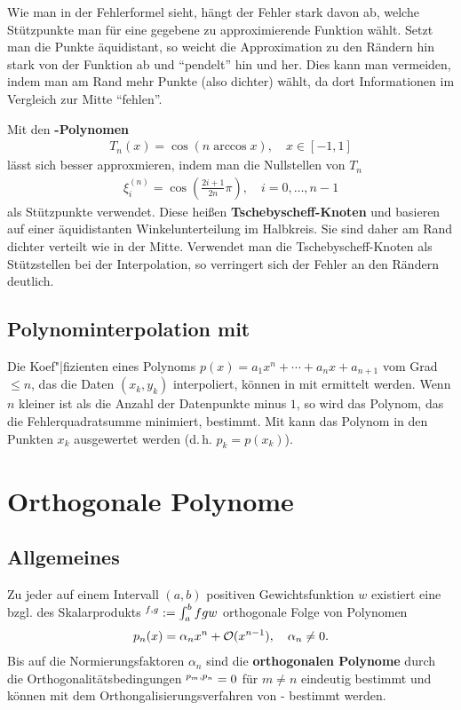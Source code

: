 \linie

Wie man in der Fehlerformel sieht, hängt der Fehler stark davon ab, welche
Stützpunkte man für eine gegebene zu approximierende Funktion wählt.
Setzt man die Punkte äquidistant, so weicht die Approximation zu den
Rändern hin stark von der Funktion ab und "`pendelt"' hin und her.
Dies kann man vermeiden, indem man am Rand mehr Punkte (also dichter) wählt,
da dort Informationen im Vergleich zur Mitte "`fehlen"'.

Mit den \textbf{-Polynomen}
\begin{align*}
    T_n(x) = \cos(n \arccos x),\quad x \in [-1, 1]
\end{align*}
lässt sich besser approxmieren, indem man die Nullstellen von $T_n$
\begin{align*}
    \xi_i^{(n)} = \cos\left(\frac{2i + 1}{2n} \pi\right),\quad
    i = 0, \dotsc, n - 1
\end{align*}
als Stützpunkte verwendet.
Diese heißen \textbf{Tschebyscheff-Knoten} und basieren auf einer äquidistanten
Winkelunterteilung im Halbkreis.
Sie sind daher am Rand dichter verteilt wie in der Mitte.
Verwendet man die Tschebyscheff-Knoten als Stützstellen bei der Interpolation,
so verringert sich der Fehler an den Rändern deutlich.

\subsection{%
    Polynominterpolation mit \matlab{}%
}

Die Koef"|fizienten eines Polynoms $p(x) = a_1 x^n + \dotsb + a_n x + a_{n+1}$
vom Grad $\le n$, das die Daten $(x_k, y_k)$ interpoliert, können in \matlab{}
mit  ermittelt werden.
Wenn $n$ kleiner ist als die Anzahl der Datenpunkte minus $1$, so wird das
Polynom, das die Fehlerquadratsumme minimiert, bestimmt.
Mit  kann das Polynom in den Punkten $x_k$ ausgewertet
werden (d.\,h. $p_k = p(x_k)$).

\section{%
    Orthogonale Polynome%
}

\subsection{%
    Allgemeines%
}

Zu jeder auf einem Intervall $(a, b)$ positiven Gewichtsfunktion $w$
existiert eine bzgl. des Skalarprodukts $\sp{f, g} := \int_a^b f g w$
orthogonale Folge von Polynomen
\begin{align*}
    p_n(x) = \alpha_n x^n + \mathcal{O}(x^{n-1}),\quad
    \alpha_n \not= 0.
\end{align*}
Bis auf die Normierungsfaktoren $\alpha_n$ sind die
\textbf{orthogonalen Polynome} durch die Orthogonalitätsbedingungen
$\sp{p_m, p_n} = 0$ für $m \not= n$ eindeutig bestimmt und können
mit dem Orthongalisierungsverfahren von - bestimmt
werden.

